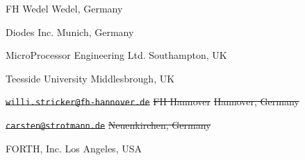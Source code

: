 	{}
	{FH Wedel}
	{Wedel, Germany}

	{}
	{Diodes Inc.}
	{Munich, Germany}

	{}
	{MicroProcessor Engineering Ltd.}
	{Southampton, UK}

	{}
	{Teesside University}
	{Middlesbrough, UK}

\cbstart
{}
	{\sout{\texttt{willi.stricker@fh-hannover.de}}}
	{\sout{FH Hannover}}
	{\sout{Hannover, Germany}}
\cbend

\cbstart
{}
	{\sout{\texttt{carsten@strotmann.de}}}
	{}
	{\sout{Neuenkirchen, Germany}}
\cbend

	{}
	{FORTH, Inc.}
	{Los Angeles, USA}
